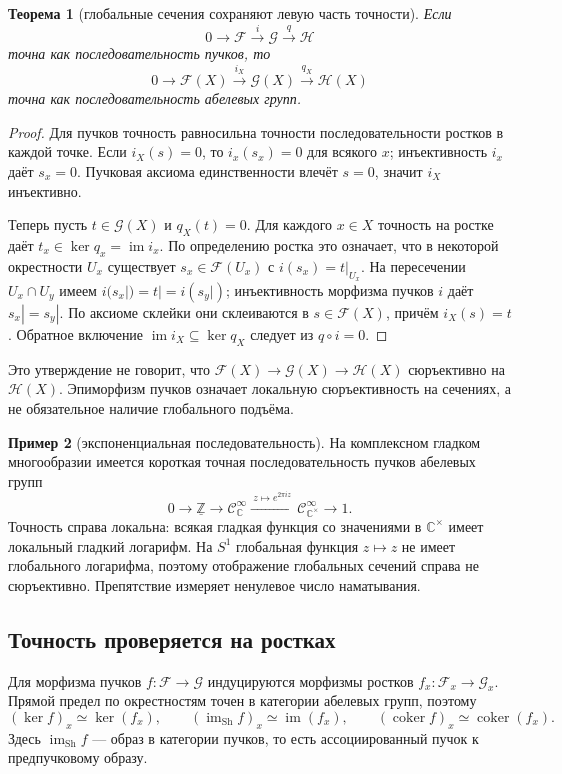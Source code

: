\documentclass[11pt,b5paper,oneside]{article}
\newcommand{\F}{\mathscr F}
\newcommand{\G}{\mathscr G}
\newcommand{\Hh}{\mathscr H}
\newcommand{\Sh}{\mathrm{Sh}}
\newcommand{\coker}{\operatorname{coker}}
\newcommand{\C}{\mathbb C}
\newcommand{\Z}{\mathbb Z}
\theoremstyle{plain}
\newtheorem{thm}{Теорема}[section]
\theoremstyle{definition}
\newtheorem{exm}[thm]{Пример}
\theoremstyle{remark}
\begin{document}
\begin{thm}[глобальные сечения сохраняют левую часть точности]
Если
\[
  0\longrightarrow\F\xrightarrow{i}\G\xrightarrow{q}\Hh
\]
точна как последовательность пучков, то
\[
  0\longrightarrow\F(X)\xrightarrow{i_X}\G(X)
  \xrightarrow{q_X}\Hh(X)
\]
точна как последовательность абелевых групп.
\end{thm}
\begin{proof}
Для пучков точность равносильна точности последовательности ростков
в каждой точке. Если $i_X(s)=0$, то $i_x(s_x)=0$ для всякого $x$;
инъективность $i_x$ даёт $s_x=0$. Пучковая аксиома единственности
влечёт $s=0$, значит $i_X$ инъективно.

Теперь пусть $t\in\G(X)$ и $q_X(t)=0$. Для каждого $x\in X$ точность
на ростке даёт $t_x\in\ker q_x=\operatorname{im}i_x$. По определению
ростка это означает, что в некоторой окрестности $U_x$ существует
$s_x\in\F(U_x)$ с $i(s_x)=t|_{U_x}$. На пересечении $U_x\cap U_y$
имеем $i(s_x|)=t|=i(s_y|)$; инъективность морфизма пучков $i$ даёт
$s_x|=s_y|$. По аксиоме склейки они склеиваются в $s\in\F(X)$,
причём $i_X(s)=t$. Обратное включение $\operatorname{im}i_X\subseteq
\ker q_X$ следует из $q\circ i=0$.
\end{proof}

Это утверждение не говорит, что $\F(X)\to\G(X)\to\Hh(X)$ сюръективно
на $\Hh(X)$. Эпиморфизм пучков означает локальную сюръективность на
сечениях, а не обязательное наличие глобального подъёма.

\begin{exm}[экспоненциальная последовательность]
На комплексном гладком многообразии имеется короткая точная
последовательность пучков абелевых групп
\[
  0\longrightarrow\underline{\Z}
  \longrightarrow\mathcal C^\infty_{\C}
  \xrightarrow{\ z\mapsto e^{2\pi iz}\ }
  \mathcal C^\infty_{\C^\times}\longrightarrow 1.
\]
Точность справа локальна: всякая гладкая функция со значениями в
$\C^\times$ имеет локальный гладкий логарифм. На $S^1$ глобальная функция
$z\mapsto z$ не имеет глобального логарифма, поэтому отображение глобальных
сечений справа не сюръективно. Препятствие измеряет ненулевое число
наматывания.
\end{exm}

\subsection{Точность проверяется на ростках}
Для морфизма пучков $f:\F\to\G$ индуцируются морфизмы ростков
$f_x:\F_x\to\G_x$. Прямой предел по окрестностям точен в категории
абелевых групп, поэтому
\[
  (\ker f)_x\simeq\ker(f_x),\qquad
  (\operatorname{im}_{\Sh} f)_x\simeq\operatorname{im}(f_x),\qquad
  (\coker f)_x\simeq\coker(f_x).
\]
Здесь $\operatorname{im}_{\Sh}f$ --- образ в категории пучков,
то есть ассоциированный пучок к предпучковому образу.
\end{document}
